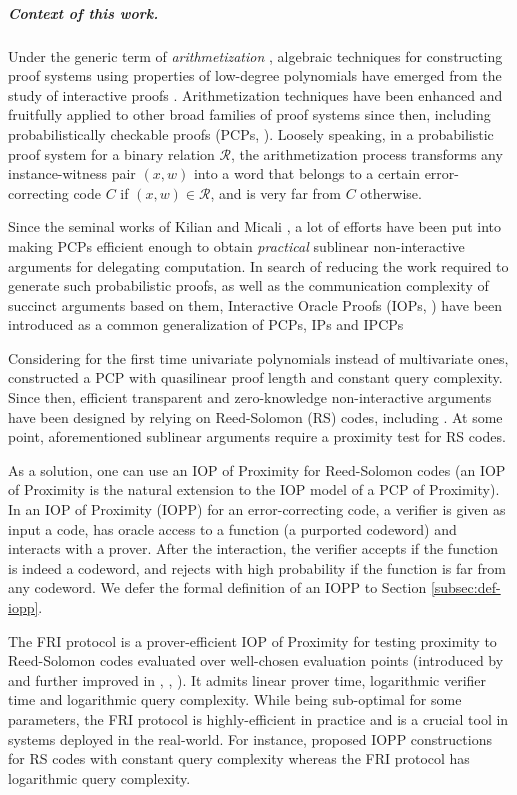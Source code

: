 \documentclass[10pt,a4paper]{article}
\theoremstyle{plain}
\theoremstyle{plain}
\theoremstyle{definition}
\theoremstyle{remark}
\theoremstyle{plain}
\begin{document}
\subparagraph*{Context of this work.}
Under the generic term of \emph{arithmetization} \cite{LFKN90}, algebraic techniques for constructing proof systems using properties of low-degree polynomials have emerged from the study of interactive proofs \cite{Bab85,GMR85}. Arithmetization techniques have been enhanced and fruitfully applied to other broad families of proof systems since then, including probabilistically checkable proofs (PCPs, \cite{BFLS91, AS92, ALM+98}). Loosely speaking, in a probabilistic proof system for a binary relation $\mathcal R$, the arithmetization process transforms any instance-witness pair $(x, w)$ into a word that belongs to a certain error-correcting code $C$ if $(x, w) \in \mathcal R$, and is very far from $C$ otherwise.

Since the seminal works of Kilian \cite{Kil92} and Micali \cite{Mic95}, a lot of efforts have been put into making PCPs efficient enough to obtain \emph{practical} sublinear non-interactive arguments for delegating computation. In search of reducing the work required to generate such probabilistic proofs, as well as the communication complexity of succinct arguments based on them, Interactive Oracle Proofs (IOPs, \cite{BCS16,RRR16}) have been introduced as a common generalization of PCPs, IPs and IPCPs \cite{KR08}

Considering for the first time univariate polynomials instead of multivariate ones, \cite{BS08, Dinur07} constructed a PCP with quasilinear proof length and constant query complexity. Since then, efficient transparent and zero-knowledge non-interactive arguments have been designed by relying on Reed-Solomon (RS) codes, including \cite{AHIV17,BBHR19,BCRSVW19,BCGGRS19,KPV19,COS20,ZXZS20}. At some point, aforementioned sublinear arguments require a proximity test for RS codes. 

As a solution, one can use an IOP of Proximity for Reed-Solomon codes (an IOP of Proximity \cite{BCGRS17} is the natural extension to the IOP model of a PCP of Proximity). In an IOP of Proximity (IOPP) for an error-correcting code, a verifier is given as input a code, has oracle access to a function (a purported codeword) and interacts with a prover. After the interaction, the verifier accepts if the function is indeed a codeword, and rejects with high probability if the function is far from any codeword. We defer the formal definition of an IOPP to Section \ref{subsec:def-iopp}. 


The \textsf{FRI} protocol is a prover-efficient IOP of Proximity for testing proximity to Reed-Solomon codes evaluated over well-chosen evaluation points (introduced by \cite{BBHR18a} and further improved in \cite{BKS18}, \cite{BGKS20}, \cite{BCIKS20}). It admits linear prover time, logarithmic verifier time and logarithmic query complexity. While being sub-optimal for some parameters, the \textsf{FRI} protocol is highly-efficient in practice and is a crucial tool in systems deployed in the real-world. For instance, \cite{BCGRS17,RR20} proposed IOPP constructions for RS codes with constant query complexity whereas the \textsf{FRI} protocol has logarithmic query complexity. 
\end{document}
